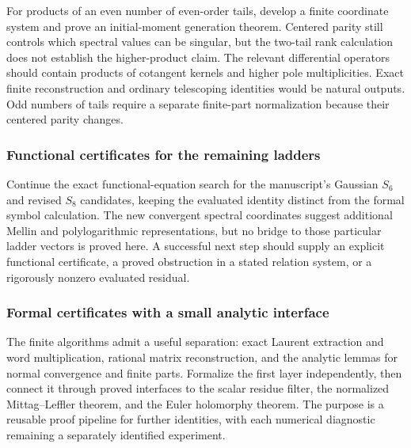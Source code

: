 For products of an even number of even-order tails, develop a finite
coordinate system and prove an initial-moment generation theorem.
Centered parity still controls which spectral values can be singular,
but the two-tail rank calculation does not establish the higher-product
claim. The relevant differential operators should contain products of
cotangent kernels and higher pole multiplicities. Exact finite
reconstruction and ordinary telescoping identities would be natural
outputs. Odd numbers of tails require a separate finite-part
normalization because their centered parity changes.

\subsubsection{Functional certificates for the remaining ladders}

Continue the exact functional-equation search for the manuscript's
Gaussian $S_6$ and revised $S_8$ candidates, keeping the evaluated
identity distinct from the formal symbol calculation. The new
convergent spectral coordinates suggest additional Mellin and
polylogarithmic representations, but no bridge to those particular
ladder vectors is proved here. A successful next step should supply an
explicit functional certificate, a proved obstruction in a stated
relation system, or a rigorously nonzero evaluated residual.

\subsubsection{Formal certificates with a small analytic interface}

The finite algorithms admit a useful separation: exact Laurent
extraction and word multiplication, rational matrix reconstruction,
and the analytic lemmas for normal convergence and finite parts.
Formalize the first layer independently, then connect it through proved
interfaces to the scalar residue filter, the normalized
Mittag--Leffler theorem, and the Euler holomorphy theorem.
The purpose is a reusable proof pipeline for further identities,
with each numerical diagnostic remaining a separately identified
experiment.

